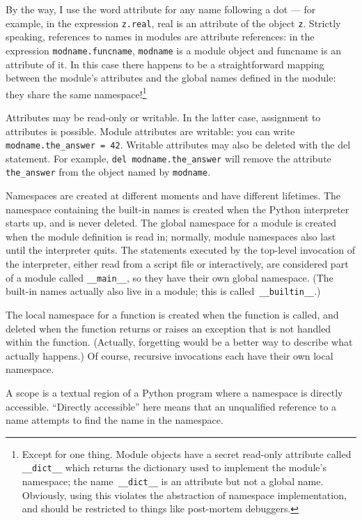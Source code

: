 \documentclass[12pt,a4paper]{article}
\begin{document}
By the way, I use the word attribute for any name following a dot — for example, in the expression \texttt{z.real}, real is an attribute of the object \texttt{z}. Strictly speaking, references to names in modules are attribute references: in the expression \texttt{modname.funcname}, \texttt{modname} is a module object and funcname is an attribute of it. In this case there happens to be a straightforward mapping between the module’s attributes and the global names defined in the module: they share the same namespace!\footnote{Except for one thing. Module objects have a secret read-only attribute called \texttt{\_\_dict\_\_} which returns the dictionary used to implement
the module’s namespace; the name\texttt{ \_\_dict\_\_} is an attribute but not a global name. Obviously, using this violates the abstraction of namespace
implementation, and should be restricted to things like post-mortem debuggers.}

Attributes may be read-only or writable. In the latter case, assignment to attributes is possible. Module attributes are writable: you can write \texttt{modname.the\_answer = 42}. Writable attributes may also be deleted with the del statement. For example, \texttt{del modname.the\_answer} will remove the attribute \texttt{the\_answer} from the object named by \texttt{modname}.

Namespaces are created at different moments and have different lifetimes. The namespace containing the built-in names is created when the Python interpreter starts up, and is never deleted. The global namespace for a module is created when the module definition is read in; normally, module namespaces also last until the interpreter quits. The statements executed by the top-level invocation of the interpreter, either read from a script file or interactively, are considered part of a module called \texttt{\_\_main\_\_}, so they have their own global namespace. (The built-in names actually also live in a module; this is called\texttt{ \_\_builtin\_\_}.)

The local namespace for a function is created when the function is called, and deleted when the function returns or raises an exception that is not handled within the function. (Actually, forgetting would be a better way to describe what actually happens.) Of course, recursive invocations each have their own local namespace.

A scope is a textual region of a Python program where a namespace is directly accessible. “Directly accessible” here means that an unqualified reference to a name attempts to find the name in the namespace.
\end{document}
